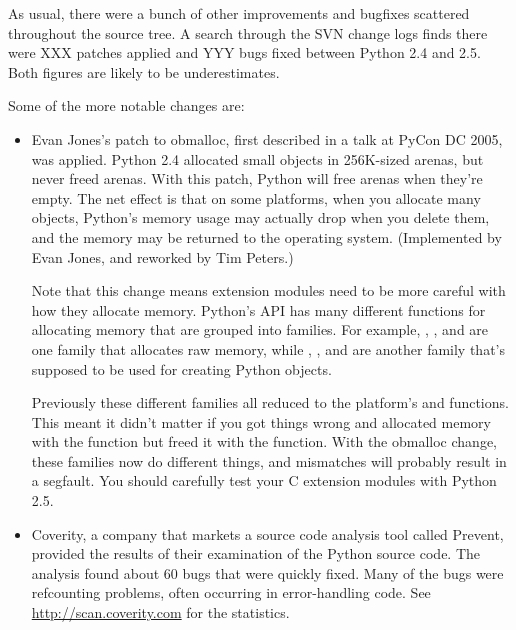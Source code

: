 \documentclass{howto}
\begin{document}
As usual, there were a bunch of other improvements and bugfixes
scattered throughout the source tree.  A search through the SVN change
logs finds there were XXX patches applied and YYY bugs fixed between
Python 2.4 and 2.5.  Both figures are likely to be underestimates.

Some of the more notable changes are:

\begin{itemize}

\item Evan Jones's patch to obmalloc, first described in a talk
at PyCon DC 2005, was applied.  Python 2.4 allocated small objects in
256K-sized arenas, but never freed arenas.  With this patch, Python
will free arenas when they're empty.  The net effect is that on some
platforms, when you allocate many objects, Python's memory usage may
actually drop when you delete them, and the memory may be returned to
the operating system.  (Implemented by Evan Jones, and reworked by Tim
Peters.)

Note that this change means extension modules need to be more careful
with how they allocate memory.  Python's API has many different
functions for allocating memory that are grouped into families.  For
example, , , and
 are one family that allocates raw memory,
while , ,
and  are another family that's supposed to
be used for creating Python objects.  

Previously these different families all reduced to the platform's
 and  functions.  This meant 
it didn't matter if you got things wrong and allocated memory with the
 function but freed it with the 
function.  With the obmalloc change, these families now do different
things, and mismatches will probably result in a segfault.  You should
carefully test your C extension modules with Python 2.5.

\item Coverity, a company that markets a source code analysis tool
  called Prevent, provided the results of their examination of the Python
  source code.  The analysis found about 60 bugs that 
  were quickly fixed.  Many of the bugs were refcounting problems, often
  occurring in error-handling code.  See
  \url{http://scan.coverity.com} for the statistics.

\end{itemize}
\end{document}
